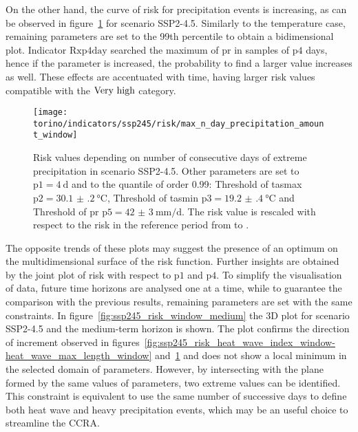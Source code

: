 On the other hand, the curve of risk for precipitation events is increasing, as can be observed in figure~\ref{fig:ssp245_risk_max_n_day_precipitation_amount_window} for scenario SSP2-4.5. Similarly to the temperature case, remaining parameters are set to the 99th percentile to obtain a bidimensional plot. Indicator $\mathrm{Rxp4day}$ searched the maximum of \gls{pr} in samples of $\mathrm{p4}$ days, hence if the parameter is increased, the probability to find a larger value increases as well. These effects are accentuated with time, having larger risk values compatible with the $\text{Very high}$ category.

\begin{figure}
  \centering
  \texttt{[image: torino/indicators/ssp245/risk/max\_n\_day\_precipitation\_amount\_window]}
  \caption{Risk values depending on number of consecutive days of extreme precipitation in scenario SSP2-4.5. Other parameters are set to $\mathrm{p1} = \qty{4}{\day}$ and to the quantile of order 0.99: {Threshold of \gls{tasmax}} $\mathrm{p2} = \qty{30.1(2)}{\degreeCelsius}$, {Threshold of \gls{tasmin}} $\mathrm{p3} = \qty{19.2(4)}{\degreeCelsius}$ and {Threshold of \gls{pr}} $\mathrm{p5} = \qty{42(3)}{\milli\metre\per\day}$. The risk value is rescaled with respect to the risk in the reference period from  to .}
  \label{fig:ssp245_risk_max_n_day_precipitation_amount_window}
\end{figure}

The opposite trends of these plots may suggest the presence of an optimum on the multidimensional surface of the risk function. Further insights are obtained by the joint plot of risk with respect to $\mathrm{p1}$ and $\mathrm{p4}$. To simplify the visualisation of data, future time horizons are analysed one at a time, while to guarantee the comparison with the previous results, remaining parameters are set with the same constraints. In figure~\ref{fig:ssp245_risk_window_medium} the 3D plot for scenario SSP2-4.5 and the medium-term horizon is shown. The plot confirms the direction of increment observed in figures~\ref{fig:ssp245_risk_heat_wave_index_window-heat_wave_max_length_window} and~\ref{fig:ssp245_risk_max_n_day_precipitation_amount_window} and does not show a local minimum in the selected domain of parameters. However, by intersecting with the plane formed by the same values of parameters, two extreme values can be identified. This constraint is equivalent to use the same number of successive days to define both heat wave and heavy precipitation events, which may be an useful choice to streamline the \gls{CCRA}.

